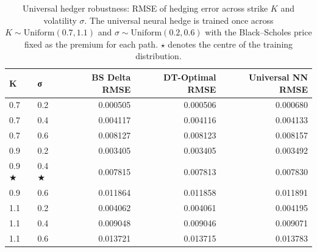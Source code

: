 \begin{table}
\caption{Universal hedger robustness: RMSE of hedging error across strike $K$ and volatility $\sigma$. The universal neural hedge is trained once across $K \sim \mathrm{Uniform}(0.7, 1.1)$ and $\sigma \sim \mathrm{Uniform}(0.2, 0.6)$ with the Black--Scholes price fixed as the premium for each path. $\star$ denotes the centre of the training distribution.}
\label{tab:universal_robustness}
\begin{tabular}{llrrr}
\toprule
K & σ & BS Delta RMSE & DT-Optimal RMSE & Universal NN RMSE \\
\midrule
0.7 & 0.2 & 0.000505 & 0.000506 & 0.000680 \\
0.7 & 0.4 & 0.004117 & 0.004116 & 0.004133 \\
0.7 & 0.6 & 0.008127 & 0.008123 & 0.008157 \\
0.9 & 0.2 & 0.003405 & 0.003405 & 0.003492 \\
0.9 ★ & 0.4 ★ & 0.007815 & 0.007813 & 0.007830 \\
0.9 & 0.6 & 0.011864 & 0.011858 & 0.011891 \\
1.1 & 0.2 & 0.004062 & 0.004061 & 0.004195 \\
1.1 & 0.4 & 0.009048 & 0.009046 & 0.009071 \\
1.1 & 0.6 & 0.013721 & 0.013715 & 0.013783 \\
\bottomrule
\end{tabular}
\end{table}
